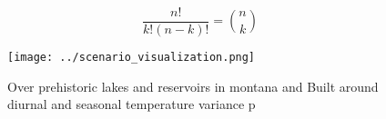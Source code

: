 \documentclass[a4paper]{article}
\begin{document}
\[ \frac{n!}{k!(n-k)!} = \binom{n}{k} \]

\begin{figure}
\centering
\texttt{[image: ../scenario\_visualization.png]}
\caption{Over prehistoric lakes and reservoirs in montana and Built around diurnal and seasonal temperature variance p
}
\end{figure}
 
\end{document}
